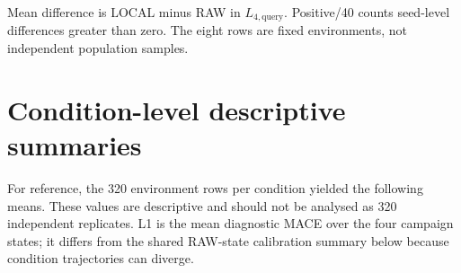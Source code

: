 \documentclass[11pt]{article}
\newcommand{\Lfourq}{\ensuremath{L_{4,\mathrm{query}}}\xspace}
\begin{document}
\begin{table}[ht]
\centering
\caption{Descriptive LOCAL--RAW heterogeneity across the eight fixed task--split environments.}
\label{tab:heterogeneity}
\scriptsize
{}%
\begin{flushleft}\footnotesize Mean difference is LOCAL minus RAW in \Lfourq. Positive/40 counts seed-level differences greater than zero. The eight rows are fixed environments, not independent population samples.\end{flushleft}
\end{table}

\section{Condition-level descriptive summaries}
For reference, the 320 environment rows per condition yielded the following means. These values are descriptive and should not be analysed as 320 independent replicates. L1 is the mean diagnostic MACE over the four campaign states; it differs from the shared RAW-state calibration summary below because condition trajectories can diverge.
\end{document}

